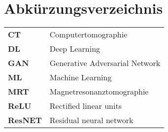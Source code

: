 
\chapter*{Abkürzungsverzeichnis}
\begin{longtable}{ll}
\textbf{CT} & Computertomographie \\
\textbf{DL} & Deep Learning \\
\textbf{GAN}  & Generative Adversarial Network \\ 
\textbf{ML} & Machine Learning\\
\textbf{MRT} & Magnetresonanztomographie \\
\textbf{ReLU} & Rectified linear units\\
\textbf{ResNET} & Residual neural network\\
\end{longtable}

\cleardoublepage